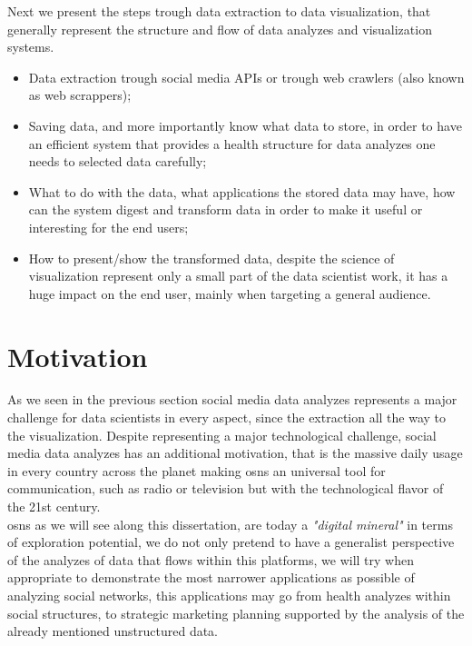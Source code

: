 Next we present the steps trough data extraction to data visualization, that generally represent the structure and flow of data analyzes and visualization systems.

\begin{itemize}
\item Data extraction trough social media APIs or trough web crawlers (also known as web scrappers);
\item Saving data, and more importantly know what data to store, in order to have an efficient system that provides a health structure for data analyzes one needs
to selected data carefully;
\item What to do with the data, what applications the stored data may have, how can the system digest and transform data in order to make it useful or interesting for the end users;
\item How to present/show the transformed data, despite the science of visualization represent only a small part of the data scientist work, it has a huge impact on the end user, mainly when targeting a general audience.
\end{itemize}

\section{Motivation}
As we seen in the previous section social media data analyzes represents a major challenge for data scientists in every aspect, since the extraction all the way to the visualization. Despite representing a major technological challenge, social media data analyzes has an additional motivation, that is the massive daily usage in every country across the planet making \glspl{osn} an universal tool for communication, such as radio or television but with the technological flavor of the 21st century.\\
\indent \glspl{osn} as we will see along this dissertation, are today a \textit{"digital mineral"} in terms of exploration potential, we do not only pretend to have a generalist perspective of the analyzes of data that flows within this platforms, we will try when appropriate to demonstrate the most narrower applications as possible of analyzing social networks, this applications may go from health analyzes within social structures, to strategic marketing planning supported by the analysis of the already mentioned unstructured data.


